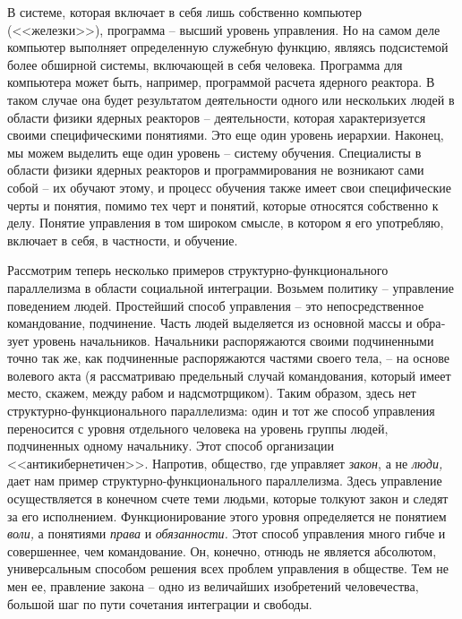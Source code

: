 \documentclass{book}
\begin{document}
В системе, которая включает в себя лишь собственно компьютер (<<железки>>), программа -- высший уровень управления. Но на самом деле компьютер выполняет определенную служебную функцию, являясь подсистемой более обширной системы, включающей в себя человека. Программа для компьютера может быть, например, программой расчета ядерного реактора. В таком случае она будет результатом деятельности одного или нескольких людей в области физики ядерных реакторов -- деятельности, которая характеризуется своими спе­цифическими понятиями. Это еще один уровень иерархии. На­конец, мы можем выделить еще один уровень -- систему обу­чения. Специалисты в области физики ядерных реакторов и про­граммирования не возникают сами собой -- их обучают этому, и процесс обучения также имеет свои специфические черты и понятия, помимо тех черт и понятий, которые относятся собст­венно к делу. Понятие управления в том широком смысле, в котором я его употребляю, включает в себя, в частности, и обучение.

Рассмотрим теперь несколько примеров структурно-функ­ционального параллелизма в области социальной интеграции. Возьмем политику -- управление поведением людей. Прос\-тей\-­ший способ управления -- это непосредственное командование, подчинение. Часть людей выделяется из основной массы и обра­зует уровень начальников. Начальники распоряжаются своими подчиненными точно так же, как подчиненные распоряжаются частями своего тела, -- на основе волевого акта (я рассматри­ваю предельный случай командования, который имеет место, скажем, между рабом и надсмотрщиком). Таким образом, здесь нет структурно-функционального параллелизма: один и тот же способ управления переносится с уровня отдельного че­ловека на уровень группы людей, подчиненных одному началь­нику. Этот способ организации <<антикибернетичен>>. Напротив, общество, где управляет \textit{закон},  а не \textit{люди,}  дает нам пример структурно-функционального параллелизма. Здесь управление осуществляется в конечном счете теми людьми, которые тол­куют закон и 
следят за его 
исполнением. Функционирование этого уровня определяется не понятием \textit{воли,}  а понятиями \textit{права}  и \textit{обязанности.}  Этот способ управления много гибче и совер­шеннее, чем командование. Он, конечно, отнюдь не является абсолютом, универсальным способом решения всех проблем управления в обществе. Тем не мен ее, правление закона -- одно из величайших изобретений человечества, большой шаг по пу­ти сочетания интеграции и свободы.
\end{document}
